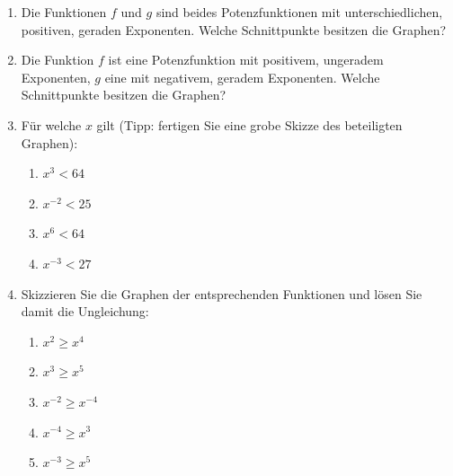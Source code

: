 \begin{enumerate}
    \item Die Funktionen \( f \) und \( g \) sind beides Potenzfunktionen mit unterschiedlichen, positiven, geraden Exponenten. Welche Schnittpunkte besitzen die Graphen?

    \item Die Funktion \( f \) ist eine Potenzfunktion mit positivem, ungeradem Exponenten, \( g \) eine mit negativem, geradem Exponenten. Welche Schnittpunkte besitzen die Graphen?

    \item Für welche \( x \) gilt (Tipp: fertigen Sie eine grobe Skizze des beteiligten Graphen):
          \begin{enumerate}
              \item \( x^3 < 64 \)
              \item \( x^{-2} < 25 \)
              \item \( x^6 < 64 \)
              \item \( x^{-3} < 27 \)
          \end{enumerate}

    \item Skizzieren Sie die Graphen der entsprechenden Funktionen und lösen Sie damit die Ungleichung:
          \begin{enumerate}
              \item \( x^2 \geq x^4 \)
              \item \( x^3 \geq x^5 \)
              \item \( x^{-2} \geq x^{-4} \)
              \item \( x^{-4} \geq x^3 \)
              \item \( x^{-3} \geq x^5 \)
          \end{enumerate}
\end{enumerate}
